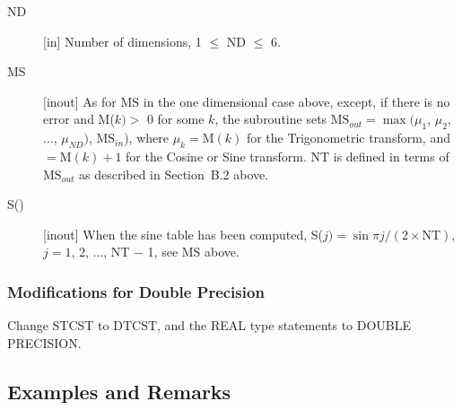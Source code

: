 \documentclass[twoside]{MATH77}
\begin{document}
\begin{description}
\item[ND]  [in] Number of dimensions, 1 $\leq $ ND $\leq $ 6.

\item[MS]  [inout]  As for MS in the one dimensional case above, except,
if there is no error and  M($k) >$ 0 for some $k$, the
subroutine sets $\text{MS}_{out} = \max
(\mu _1$, $\mu _2$, ..., $\mu_{ND})$, $\text{MS}_{in}$), where $\mu _k=
\text{M}(k)$ for the Trigonometric transform,
and $=\text{M}(k)+1$ for the Cosine or Sine transform.  NT is defined
in terms of $\text{MS}_{out}$ as described in Section~B.2 above.

\item[S()]  [inout] When the sine table has been computed, S($j)=\sin \pi
j/(2\times \text{NT})$, $j=1$, 2, ..., NT $-$ 1, see MS above.
\end{description}

\subsubsection{Modifications for Double Precision}

Change STCST to DTCST, and the REAL type statements to DOUBLE PRECISION.

\subsection{Examples and Remarks}
\end{document}
